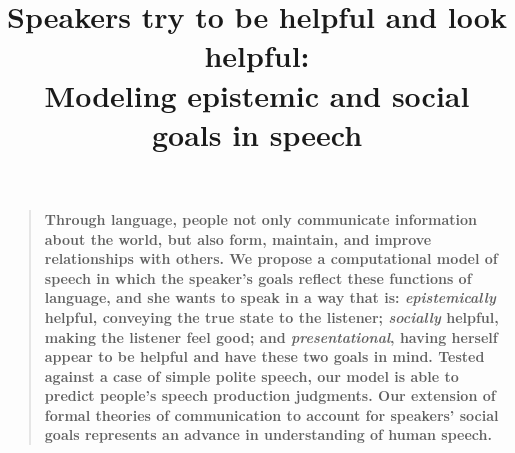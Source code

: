 \documentclass[12pt]{article}
\title{Speakers try to be helpful and look helpful: \\ Modeling epistemic and social goals in speech}
\author
%
{Erica J. Yoon,$^{1\ast\dagger}$ Michael Henry Tessler,$^{1\ast}$ Noah D. Goodman,$^{1}$ Michael C. Frank$^{1}$\\
\\
\normalsize{$^{1}$Department of Psychology, Stanford University,}\\
\normalsize{450 Serra Mall, Stanford, CA 94305.}
\\
\normalsize{$^\ast$These authors contributed equally to this work.}
\\
\normalsize{$^\dagger$To whom correspondence should be addressed; E-mail: ejyoon@stanford.edu.}
}
\date{}
\newenvironment{sciabstract}{%
\begin{quote} \bf}
{\end{quote}}
\begin{document}
 


\baselineskip24pt


\maketitle 






\begin{sciabstract}
Through language, people not only communicate information about the world, 
but also form, maintain, and improve relationships with others.
We propose a computational model of speech 
in which the speaker's goals reflect these functions of language, 
and she wants to speak in a way that is:
\emph{epistemically} helpful, conveying the true state to the listener;
\emph{socially} helpful, making the listener feel good; and
\emph{presentational}, having herself appear to be helpful and have these two goals in mind. 
Tested against a case of simple polite speech, our model is able to predict people's speech production judgments. 
Our extension of formal theories of communication to account for speakers' social
goals represents an advance in understanding of human speech.
\end{sciabstract}
\end{document}
